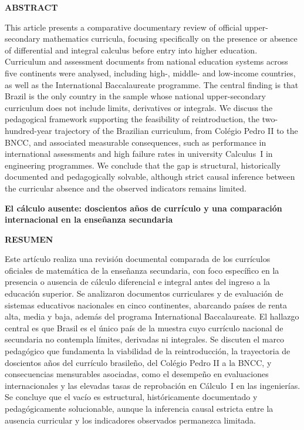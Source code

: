 \documentclass[12pt,a4paper,oneside]{article}
\begin{document}
\noindent\textbf{ABSTRACT}\\[2pt]
{\small\noindent
This article presents a comparative documentary review of official
upper-secondary mathematics curricula, focusing specifically on the
presence or absence of differential and integral calculus before
entry into higher education. Curriculum and assessment documents from
national education systems across five continents were analysed,
including high-, middle- and low-income countries, as well as the
International Baccalaureate programme. The central finding is that
Brazil is the only country in the sample whose national upper-secondary
curriculum does not include limits, derivatives or integrals. We discuss
the pedagogical framework supporting the feasibility of reintroduction,
the two-hundred-year trajectory of the
Brazilian curriculum, from Colégio Pedro II to the BNCC, and associated
measurable consequences, such as performance in international assessments
and high failure rates in university Calculus~I in engineering programmes.
We conclude that the gap is structural, historically documented and
pedagogically solvable, although strict causal inference between the
curricular absence and the observed indicators remains limited.\par}

\smallskip
{}

\medskip

\begin{center}
{\bfseries El cálculo ausente: doscientos años de currículo y una
comparación internacional en la enseñanza secundaria}
\end{center}
\vspace{2pt}

\noindent\textbf{RESUMEN}\\[2pt]
{\small\noindent
Este artículo realiza una revisión documental comparada de los
currículos oficiales de matemática de la enseñanza secundaria, con foco
específico en la presencia o ausencia de cálculo diferencial e integral
antes del ingreso a la educación superior. Se analizaron documentos
curriculares y de evaluación de sistemas educativos nacionales en cinco
continentes, abarcando países de renta alta, media y baja, además del
programa International Baccalaureate. El hallazgo central es que Brasil
es el único país de la muestra cuyo currículo nacional de secundaria no
contempla límites, derivadas ni integrales. Se discuten el marco
pedagógico que fundamenta la viabilidad de la reintroducción, la
trayectoria de doscientos años del currículo
brasileño, del Colégio Pedro II a la BNCC, y consecuencias mensurables
asociadas, como el desempeño en evaluaciones internacionales y las
elevadas tasas de reprobación en Cálculo~I en las ingenierías. Se
concluye que el vacío es estructural, históricamente documentado y
pedagógicamente solucionable, aunque la inferencia causal estricta
entre la ausencia curricular y los indicadores observados permanezca
limitada.\par}
\end{document}
